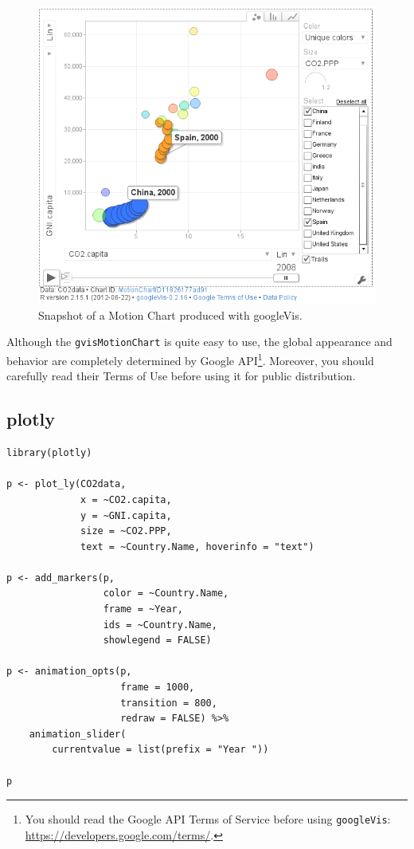 \begin{figure}
  \centering
  \includegraphics[width=\textwidth]{figs/googleVis}
  \caption{Snapshot of a Motion Chart produced with googleVis.}
  \label{fig:googleVis}
\end{figure}


Although the \texttt{gvisMotionChart} is quite easy to use, the global
appearance and behavior are completely determined by Google
API\footnote{You should read the Google API Terms of Service before using
\texttt{googleVis}: \url{https://developers.google.com/terms/}.}. Moreover, you should carefully read their Terms of Use
before using it for public distribution.


\subsection{plotly}
\label{sec:org5de0add}


\lstset{language=r,label= ,caption= ,captionpos=b,numbers=none}
\begin{lstlisting}
library(plotly)

p <- plot_ly(CO2data,
             x = ~CO2.capita,
             y = ~GNI.capita,
             size = ~CO2.PPP, 
             text = ~Country.Name, hoverinfo = "text")

p <- add_markers(p,
                 color = ~Country.Name,
                 frame = ~Year,
                 ids = ~Country.Name,
                 showlegend = FALSE)

p <- animation_opts(p,
                    frame = 1000,
                    transition = 800,
                    redraw = FALSE) %>%
    animation_slider(
        currentvalue = list(prefix = "Year "))

p
\end{lstlisting}

